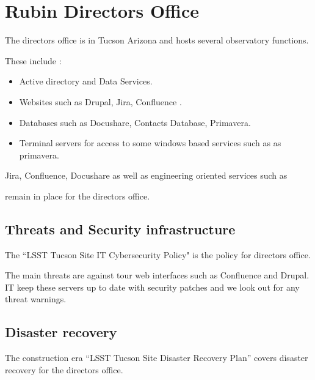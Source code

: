 \section{Rubin Directors Office} \label{sec:rdo}

The directors office is in Tucson Arizona and hosts several observatory functions.

These include :

\begin{itemize}
\item Active directory and Data Services.
\item Websites such as Drupal, Jira, Confluence .
\item Databases such as Docushare, Contacts Database, Primavera.
\item Terminal servers for access to some windows based services such as as primavera.
\end{itemize}
Jira, Confluence, Docushare  as well as  engineering oriented services such as


remain in place for the directors office.


\subsection{Threats and Security infrastructure}
The “LSST Tucson Site IT Cybersecurity Policy"  is the policy for directors office.

The main threats are against tour web interfaces such as Confluence and Drupal.
IT keep these servers up to date with security patches and we look out for any threat warnings.


\subsection {Disaster recovery}
The construction era  “LSST Tucson Site Disaster Recovery Plan”  covers disaster recovery for the directors office.
